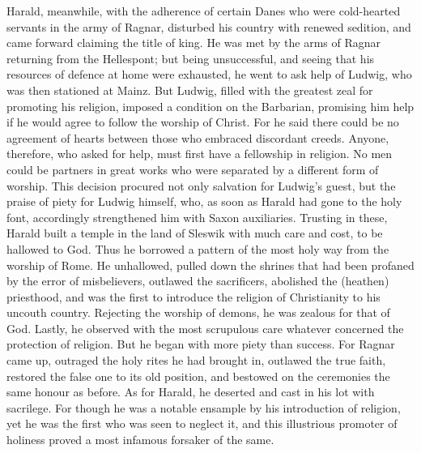 \documentclass[10pt,a4paper]{report}
\begin{document}
Harald, meanwhile, with the adherence of certain Danes who were cold-hearted servants in the army of Ragnar, disturbed his country with renewed sedition, and came forward claiming the title of king. He was met by the arms of Ragnar returning from the Hellespont; but being unsuccessful, and seeing that his resources of defence at home were exhausted, he went to ask help of Ludwig, who was then stationed at Mainz. But Ludwig, filled with the greatest zeal for promoting his religion, imposed a condition on the Barbarian, promising him help if he would agree to follow the worship of Christ. For he said there could be no agreement of hearts between those who embraced discordant creeds. Anyone, therefore, who asked for help, must first have a fellowship in religion. No men could be partners in great works who were separated by a different form of worship. This decision procured not only salvation for Ludwig's guest, but the praise of piety for Ludwig himself, who, as soon as Harald had gone to the holy font, accordingly strengthened him with Saxon auxiliaries. Trusting in these, Harald built a temple in the land of Sleswik with much care and cost, to be hallowed to God. Thus he borrowed a pattern of the most holy way from the worship of Rome. He unhallowed, pulled down the shrines that had been profaned by the error of misbelievers, outlawed the sacrificers, abolished the (heathen) priesthood, and was the first to introduce the religion of Christianity to his uncouth country. Rejecting the worship of demons, he was zealous for that of God. Lastly, he observed with the most scrupulous care whatever concerned the protection of religion. But he began with more piety than success. For Ragnar came up, outraged the holy rites he had brought in, outlawed the true faith, restored the false one to its old position, and bestowed on the ceremonies the same honour as before. As for Harald, he deserted and cast in his lot with sacrilege. For though he was a notable ensample by his introduction of religion, yet he was the first who was seen to neglect it, and this illustrious promoter of holiness proved a most infamous forsaker of the same.\\
\end{document}
